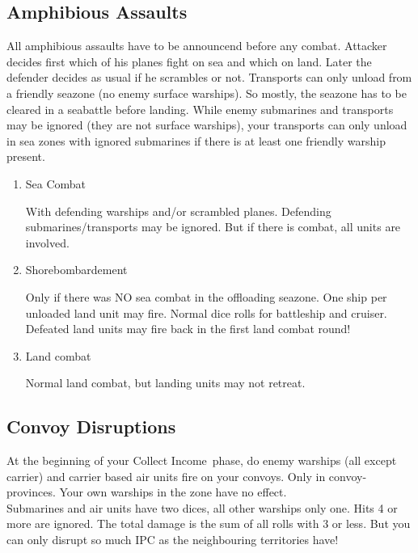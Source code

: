 \documentclass[10pt,twoside]{article}
\begin{document}
\begin{multicols*}{3}
\subsection*{Amphibious Assaults}
All amphibious assaults have to be announcend before any combat. Attacker decides first which of his planes fight on sea and which on land. Later the defender decides as usual if he scrambles or not. Transports can only unload from a friendly seazone (no enemy surface warships). So mostly, the seazone has to be cleared in a seabattle before landing. While enemy submarines and transports may be ignored (they are not surface warships), your transports can only unload in sea zones with ignored submarines if there is at least one friendly warship present.
\begin{enumerate}
\item Sea Combat

With defending warships and/or scrambled planes. Defending submarines/transports may be ignored. But if there is combat, all units are involved.
\item Shorebombardement

Only if there was NO sea combat in the offloading seazone.  One ship per unloaded land unit may fire. Normal dice rolls for battleship and cruiser. Defeated land units may fire back in the first land combat round!
\item Land combat

Normal land combat, but landing units may not retreat.
\end{enumerate}

\subsection*{Convoy Disruptions}
At the beginning of your \glqq Collect Income\grqq\ phase, do enemy warships (all except carrier) and carrier based air units fire on your convoys. Only in convoy-provinces. Your own warships in the zone have no effect.\\
Submarines and air units have two dices, all other warships only one. Hits 4 or more are ignored. The total damage is the sum of all rolls with 3 or less. But you can only disrupt so much IPC as the neighbouring territories have!


\end{multicols*}
\end{document}
